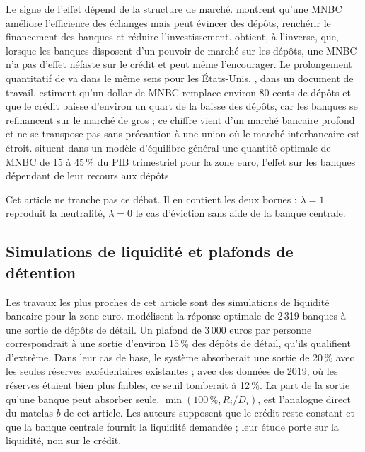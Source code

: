 \documentclass[11pt,a4paper]{article}
\begin{document}
	Le signe de l'effet dépend de la structure de marché. \citet{keister2023} montrent qu'une MNBC améliore l'efficience des échanges mais peut évincer des dépôts, renchérir le financement des banques et réduire l'investissement. \citet{andolfatto2021} obtient, à l'inverse, que, lorsque les banques disposent d'un pouvoir de marché sur les dépôts, une MNBC n'a pas d'effet néfaste sur le crédit et peut même l'encourager. Le prolongement quantitatif de \citet{chiu2023} va dans le même sens pour les États-Unis. \citet{whited2023}, dans un document de travail, estiment qu'un dollar de MNBC remplace environ 80 cents de dépôts et que le crédit baisse d'environ un quart de la baisse des dépôts, car les banques se refinancent sur le marché de gros ; ce chiffre vient d'un marché bancaire profond et ne se transpose pas sans précaution à une union où le marché interbancaire est étroit. \citet{burlon2024} situent dans un modèle d'équilibre général une quantité optimale de MNBC de 15 à 45\,\% du PIB trimestriel pour la zone euro, l'effet sur les banques dépendant de leur recours aux dépôts.
	
	Cet article ne tranche pas ce débat. Il en contient les deux bornes : $\lambda=1$ reproduit la neutralité, $\lambda=0$ le cas d'éviction sans aide de la banque centrale.
	
	\subsection{Simulations de liquidité et plafonds de détention}
	
	Les travaux les plus proches de cet article sont des simulations de liquidité bancaire pour la zone euro. \citet{meller2023} modélisent la réponse optimale de 2\,319 banques à une sortie de dépôts de détail. Un plafond de 3\,000 euros par personne correspondrait à une sortie d'environ 15\,\% des dépôts de détail, qu'ils qualifient d'extrême. Dans leur cas de base, le système absorberait une sortie de 20\,\% avec les seules réserves excédentaires existantes ; avec des données de 2019, où les réserves étaient bien plus faibles, ce seuil tomberait à 12\,\%. La part de la sortie qu'une banque peut absorber seule, $\min(100\,\%, R_i/D_i)$, est l'analogue direct du matelas $b$ de cet article. Les auteurs supposent que le crédit reste constant et que la banque centrale fournit la liquidité demandée ; leur étude porte sur la liquidité, non sur le crédit.
	
\end{document}
